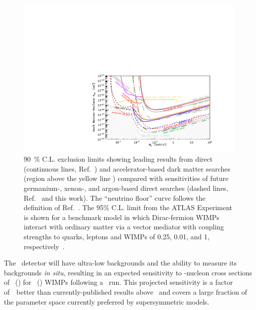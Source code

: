 \begin{figure}[t!]
\begin{center}
\includegraphics[width=\textwidth]{./Figures/DSklSensitivitySimplified.pdf}
\caption[Current \DM\ limits and sensitivities for future experiments.]
{\SI{90}{\percent} C.L. exclusion limits showing leading results from direct (continuous lines, Ref.~\cite{Angloher:2012kl,Akerib:2017kg,Cui:2017kg,Aprile:2018ct,Agnes:2018ep,Agnes:2018fg}) and accelerator-based dark matter searches (region above the yellow line \cite{TheATLASCollaboration:2018to}) compared with sensitivities of future germanium-, xenon-, and argon-based direct searches (dashed lines, Ref.~\cite{Nelson:2014wy,Kudryavtsev:2015hy,Aprile:2015wv,Boulay:2017tn,Agnese:2017fn} and this work).  The ``neutrino floor'' curve follows the definition of Ref.~\cite{Billard:2014cx}. The 95\% C.L. limit from the ATLAS Experiment is shown for a benchmark model in which Dirac-fermion WIMPs interact with ordinary matter via a vector mediator with coupling strengths to quarks, leptons and WIMPs of 0.25, 0.01, and 1, respectively~\cite{Abercrombie:2015to}.}
\label{fig:DSklSensitivitySimplified}
\end{center}
\end{figure}

The \DSks\ detector will have ultra-low backgrounds and the ability to measure its backgrounds {\it in situ}, resulting in an expected sensitivity to \WIMP-nucleon cross sections of \DSkSensitivityOneGeVUnit\ (\DSkSensitivityTenGeVUnit) for \WIMPMassOneTev\ (\WIMPMassTenTev) WIMPs following a \DSkRunTimePlannedVerbal\ run.  This projected sensitivity is a factor of~\DSkSensitivityImprovementOneTeV\ better than currently-published results above \WIMPMassOneTev\ and covers a large fraction of the parameter space currently preferred by supersymmetric models.


